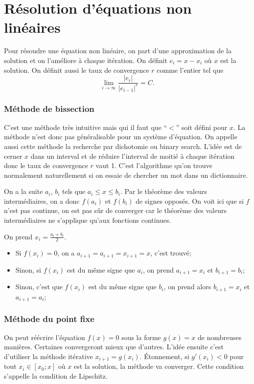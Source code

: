 \part{Résolution d'équations non linéaires}
Pour résoudre une équation non linéaire,
on part d'une approximation de la solution et on l'améliore
à chaque itération.
On définit
$e_i = x - x_i$ où $x$ est la solution.
On définit aussi le taux de convergence $r$ comme l'entier tel que
\[ \lim_{i\to\infty} \frac{|e_i|}{|e_{i-1}|^r} = C. \]

\section{Méthode de bissection}
C'est une méthode très intuitive mais qui il faut que ``$<$'' soit défini
pour $x$.
La méthode n'est donc pas généralisable pour un système d'équation.
On appelle aussi cette méthode la recherche par dichotomie ou
binary search.
L'idée est de cerner $x$ dans un interval et de réduire l'interval de moitié
à chaque itération donc le taux de convergence $r$ vaut 1.
C'est l'algorithme qu'on trouve normalement naturellement si on essaie
de chercher un mot dans un dictionnaire.

On a la suite $a_i$, $b_i$ tels que $a_i \leq x \leq b_i$.
Par le théorème des valeurs intermédiaires, on a donc
$f(a_i)$ et $f(b_i)$ de signes opposés.
On voit ici que si $f$ n'est pas continue,
on est pas sûr de converger car le théorème des valeurs
intermédiaires ne s'applique qu'aux fonctions continues.

On prend $x_i = \frac{a_i + b_i}{2}$.
\begin{itemize}
  \item Si $f(x_i) = 0$,
    on a $a_{i+1} = a_{i+1} = x_{i+1} = x$, c'est trouvé;
  \item Sinon, si $f(x_i)$ est du même signe que $a_i$,
    on prend $a_{i+1} = x_i$ et $b_{i+1} = b_i$;
  \item Sinon, c'est que $f(x_i)$ est du même signe que $b_i$,
    on prend alors $b_{i+1} = x_i$ et $a_{i+1} = a_i$;
\end{itemize}



\section{Méthode du point fixe}
On peut réécrire l'équation $f(x) = 0$ sous la forme $g(x) = x$ de nombreuses
manières.
Certaines convergeront mieux que d'autres.
L'idée ensuite c'est d'utiliser la méthode itérative $x_{i+1} = g(x_i)$.
Étonnement, si $g'(x_i) < 0$ pour tout $x_i \in [x_0; x]$
où $x$ est la solution, la méthode va converger.
Cette condition s'appelle la condition de Lipschitz.

